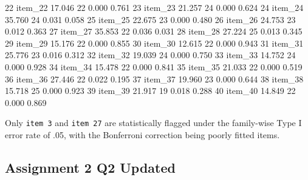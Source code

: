 \documentclass[
]{article}
\newenvironment{Shaded}{\begin{snugshade}}{\end{snugshade}}
\newcommand{\DecValTok}[1]{\textcolor[rgb]{0.00,0.00,0.81}{#1}}
\newcommand{\FloatTok}[1]{\textcolor[rgb]{0.00,0.00,0.81}{#1}}
\newcommand{\NormalTok}[1]{#1}
\begin{document}
\begin{Shaded}
\begin{Highlighting}[]
\DecValTok{22}\NormalTok{ item\_22 }\FloatTok{17.046}      \DecValTok{22}      \FloatTok{0.000}  \FloatTok{0.761}
\DecValTok{23}\NormalTok{ item\_23 }\FloatTok{21.257}      \DecValTok{24}      \FloatTok{0.000}  \FloatTok{0.624}
\DecValTok{24}\NormalTok{ item\_24 }\FloatTok{35.760}      \DecValTok{24}      \FloatTok{0.031}  \FloatTok{0.058}
\DecValTok{25}\NormalTok{ item\_25 }\FloatTok{22.675}      \DecValTok{23}      \FloatTok{0.000}  \FloatTok{0.480}
\DecValTok{26}\NormalTok{ item\_26 }\FloatTok{24.753}      \DecValTok{23}      \FloatTok{0.012}  \FloatTok{0.363}
\DecValTok{27}\NormalTok{ item\_27 }\FloatTok{35.853}      \DecValTok{22}      \FloatTok{0.036}  \FloatTok{0.031}
\DecValTok{28}\NormalTok{ item\_28 }\FloatTok{27.224}      \DecValTok{25}      \FloatTok{0.013}  \FloatTok{0.345}
\DecValTok{29}\NormalTok{ item\_29 }\FloatTok{15.176}      \DecValTok{22}      \FloatTok{0.000}  \FloatTok{0.855}
\DecValTok{30}\NormalTok{ item\_30 }\FloatTok{12.615}      \DecValTok{22}      \FloatTok{0.000}  \FloatTok{0.943}
\DecValTok{31}\NormalTok{ item\_31 }\FloatTok{25.776}      \DecValTok{23}      \FloatTok{0.016}  \FloatTok{0.312}
\DecValTok{32}\NormalTok{ item\_32 }\FloatTok{19.039}      \DecValTok{24}      \FloatTok{0.000}  \FloatTok{0.750}
\DecValTok{33}\NormalTok{ item\_33 }\FloatTok{14.752}      \DecValTok{24}      \FloatTok{0.000}  \FloatTok{0.928}
\DecValTok{34}\NormalTok{ item\_34 }\FloatTok{15.478}      \DecValTok{22}      \FloatTok{0.000}  \FloatTok{0.841}
\DecValTok{35}\NormalTok{ item\_35 }\FloatTok{21.033}      \DecValTok{22}      \FloatTok{0.000}  \FloatTok{0.519}
\DecValTok{36}\NormalTok{ item\_36 }\FloatTok{27.446}      \DecValTok{22}      \FloatTok{0.022}  \FloatTok{0.195}
\DecValTok{37}\NormalTok{ item\_37 }\FloatTok{19.960}      \DecValTok{23}      \FloatTok{0.000}  \FloatTok{0.644}
\DecValTok{38}\NormalTok{ item\_38 }\FloatTok{15.718}      \DecValTok{25}      \FloatTok{0.000}  \FloatTok{0.923}
\DecValTok{39}\NormalTok{ item\_39 }\FloatTok{21.917}      \DecValTok{19}      \FloatTok{0.018}  \FloatTok{0.288}
\DecValTok{40}\NormalTok{ item\_40 }\FloatTok{14.849}      \DecValTok{22}      \FloatTok{0.000}  \FloatTok{0.869}
\end{Highlighting}
\end{Shaded}

Only \texttt{item\ 3} and \texttt{item\ 27} are statistically flagged
under the family-wise Type I error rate of .05, with the Bonferroni
correction being poorly fitted items.

\hypertarget{assignment-2-q2-updated}{%
\subsection{Assignment 2 Q2 Updated}\label{assignment-2-q2-updated}}
\end{document}
